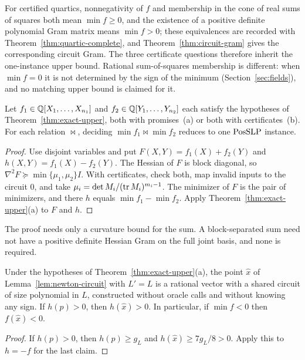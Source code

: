 For certified quartics, nonnegativity of $f$ and membership in the cone of
real sums of squares both mean $\min f\ge0$, and the existence of a positive
definite polynomial Gram matrix means $\min f>0$; these equivalences are
recorded with Theorem~\ref{thm:quartic-complete}, and Theorem~\ref{thm:circuit-gram}
gives the corresponding circuit Gram. The three certificate questions
therefore inherit the one-instance upper bound. Rational sum-of-squares
membership is different: when $\min f=0$ it is not determined by the sign of
the minimum (Section~\ref{sec:fields}), and no matching upper bound is claimed
for it.

\begin{corollary}
\label{cor:upper-two-minima}
Let $f_1\in\mathbb Q[X_1,\ldots,X_{n_1}]$ and $f_2\in\mathbb Q[Y_1,\ldots,Y_{n_2}]$ each
satisfy the hypotheses of Theorem~\ref{thm:exact-upper}, both with
promises~(a) or both with certificates~(b). For each relation ${\bowtie}$,
deciding $\min f_1\bowtie\min f_2$ reduces to one $\mathrm{PosSLP}$ instance.
\end{corollary}

\begin{proof}
Use disjoint variables and put $F(X,Y)=f_1(X)+f_2(Y)$ and
$h(X,Y)=f_1(X)-f_2(Y)$. The Hessian of $F$ is block diagonal, so
$\nabla^2F\succeq\min\{\mu_1,\mu_2\}I$. With certificates, check both, map
invalid inputs to the circuit $0$, and take
$\mu_i=\det M_i/(\operatorname{tr} M_i)^{m_i-1}$. The minimizer of $F$ is the pair of minimizers,
and there $h$ equals $\min f_1-\min f_2$. Apply
Theorem~\ref{thm:exact-upper}(a) to $F$ and $h$.
\end{proof}

The proof needs only a curvature bound for the sum. A block-separated sum
need not have a positive definite Hessian Gram on the full joint basis, and
none is required.

\begin{proposition}
\label{prop:upper-circuit-witness}
Under the hypotheses of Theorem~\ref{thm:exact-upper}(a), the point $\hat x$
of Lemma~\ref{lem:newton-circuit} with $L'=L$ is a rational vector with a
shared circuit of size polynomial in $L$, constructed without oracle calls
and without knowing any sign. If $h(p)>0$, then $h(\hat x)>0$. In particular,
if $\min f<0$ then $f(\hat x)<0$.
\end{proposition}

\begin{proof}
If $h(p)>0$, then $h(p)\ge g_L$ and $h(\hat x)\ge7g_L/8>0$. Apply this to
$h=-f$ for the last claim.
\end{proof}

